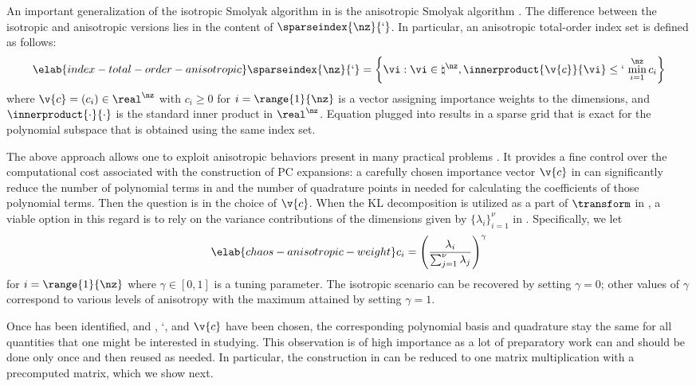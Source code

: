 An important generalization of the isotropic Smolyak algorithm in
 is the anisotropic Smolyak algorithm \cite{nobile2008}.
The difference between the isotropic and anisotropic versions lies in the
content of $\sparseindex{\nz}{\lq}$. In particular, an anisotropic total-order
index set is defined as follows:
\begin{equation} \elab{index-total-order-anisotropic}
  \sparseindex{\nz}{\lq} = \left\{ \vi: \vi \in \natural^\nz, \innerproduct{\v{c}}{\vi} \leq \lq \, \min_{i = 1}^\nz c_i \right\}
\end{equation}
where $\v{c} = (c_i) \in \real^\nz$ with $c_i \geq 0$ for $i = \range{1}{\nz}$
is a vector assigning importance weights to the dimensions, and
$\innerproduct{\cdot}{\cdot}$ is the standard inner product in $\real^\nz$.
Equation  plugged into
 results in a sparse grid that is exact for the
polynomial subspace that is obtained using the same index set.

The above approach allows one to exploit anisotropic behaviors present in many
practical problems \cite{nobile2008}. It provides a fine control over the
computational cost associated with the construction of \ac{PC} expansions: a
carefully chosen importance vector $\v{c}$ in
 can significantly reduce the number of
polynomial terms in  and the number of quadrature points
in  needed for calculating the coefficients of those
polynomial terms. Then the question is in the choice of $\v{c}$. When the
\ac{KL} decomposition is utilized as a part of $\transform$ in
, a viable option in this regard is to rely on the
variance contributions of the dimensions given by $\{ \lambda_i \}_{i = 1}^\nu$
in . Specifically, we let
\begin{equation} \elab{chaos-anisotropic-weight}
  c_i = \left(\frac{\lambda_i}{\sum_{j = 1}^\nu \lambda_j}\right)^\gamma
\end{equation}
for $i = \range{1}{\nz}$ where $\gamma \in [0, 1]$ is a tuning parameter. The
isotropic scenario can be recovered by setting $\gamma = 0$; other values of
$\gamma$ correspond to various levels of anisotropy with the maximum attained by
setting $\gamma = 1$.

Once \vz has been identified, and \lc, \lq, and $\v{c}$ have been chosen, the
corresponding polynomial basis and quadrature stay the same for all quantities
that one might be interested in studying. This observation is of high importance
as a lot of preparatory work can and should be done only once and then reused as
needed. In particular, the construction in  can be reduced
to one matrix multiplication with a precomputed matrix, which we show next.

